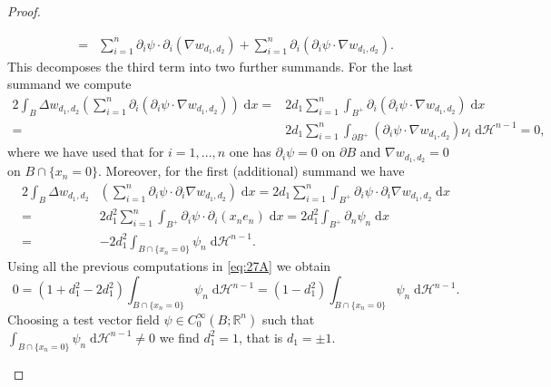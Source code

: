 \documentclass[twoside,11pt]{article}
\theoremstyle{definition}
\begin{document}
\begin{proof}
\begin{itemize}
\begin{align*}
			 =& \sum_{i = 1}^n \partial_i \psi \cdot  \partial_i (\nabla w_{d_1,d_2}) +  \sum_{i = 1}^n \partial_i (\partial_i \psi \cdot \nabla w_{d_1,d_2}). 
		\end{align*}
		This decomposes the third term into two further summands. For the last summand we compute
		\begin{align*}
			2 \int_B \Delta w_{d_1,d_2} \left( \sum_{i = 1}^n \partial_i (\partial_i \psi \cdot \nabla w_{d_1,d_2}) \right) \; \mathrm{d}x =& 2d_1 \sum_{i = 1}^n \int_{B^+} \partial_i(\partial_i \psi \cdot \nabla w_{d_1,d_2}) \; \mathrm{d}x\\
			= &2d_1 \sum_{i = 1}^n \int_{\partial B^+} (\partial_i \psi \cdot \nabla w_{d_1,d_2}) \nu_i \; \mathrm{d}\mathcal{H}^{n-1} = 0,
		\end{align*}
		where we have used that for $i= 1,..., n$ one has $\partial_i \psi = 0$ on $\partial B$ and $\nabla w_{d_1,d_2}= 0$ on $B \cap \{x_n = 0 \}$. Moreover, for the first (additional) summand we have 
		\begin{align}
			 2 \int_B \Delta w_{d_1,d_2} &\left( \sum_{i = 1}^n \partial_i \psi \cdot \partial_i  \nabla w_{d_1,d_2} \right) \; \mathrm{d}x   
			 = 2d_1 \sum_{i = 1}^n \int_{B^+} \partial_i \psi \cdot \partial_i \nabla w_{d_1,d_2} \; \mathrm{d}x\nonumber\\
			=&2 d_1^2 \sum_{i = 1}^n \int_{B^+} \partial_i \psi \cdot \partial_i \left(x_n e_n\right)\; \mathrm{d}x%
			  =2 d_1^2 \int_{B^+} \partial_n\psi_n \; \mathrm{d}x \nonumber\\
			=& - 2 d_1^2 \int_{B \cap \{x_n = 0 \}} \psi_n \; \mathrm{d}\mathcal{H}^{n-1} . \label{eq:differentsign}
		\end{align}
		Using all the previous computations in \eqref{eq:27A} we obtain 
		\begin{equation*}
			0 = (1+ d_1^2 - 2d_1^2) \int_{B \cap \{x_n = 0 \} } \psi_n \; \mathrm{d}\mathcal{H}^{n-1} = (1-d_1^2)  \int_{B \cap \{x_n = 0\} } \psi_n \; \mathrm{d}\mathcal{H}^{n-1}.  
		\end{equation*}
		Choosing a test vector field $\psi\in C_0^\infty(B;\mathbb{R}^n)$ such that $\int_{B \cap \{x_n = 0 \} } \psi_n \; \mathrm{d}\mathcal{H}^{n-1} \neq 0$ we find $d_1^2 = 1$, that is $d_1 = \pm 1$.
		

\end{itemize}
\end{proof}
\end{document}
